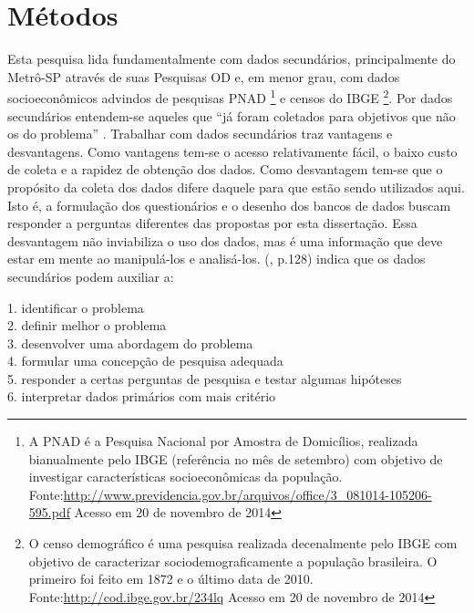 \chapter{Métodos}\label{chap:metodo}


Esta pesquisa lida fundamentalmente com dados secundários, principalmente do Metrô-SP através de suas Pesquisas OD e, em menor grau, com dados socioeconômicos advindos de pesquisas PNAD%
\footnote{A PNAD é a Pesquisa Nacional por Amostra de Domicílios, realizada bianualmente pelo IBGE (referência no mês de setembro) com objetivo de investigar características socioeconômicas da população. Fonte:\url{http://www.previdencia.gov.br/arquivos/office/3_081014-105206-595.pdf} Acesso em 20 de novembro de 2014} e censos do IBGE%
\footnote{O censo demográfico é uma pesquisa realizada decenalmente pelo IBGE com objetivo de caracterizar sociodemograficamente a população brasileira. O primeiro foi feito em 1872 e o último data de 2010. Fonte:\url{http://cod.ibge.gov.br/234lq} Acesso em 20 de novembro de 2014}.
Por dados secundários entendem-se aqueles que ``já foram coletados para objetivos que não os do problema'' \cite[p.127]{MALHORTA2001}. Trabalhar com dados secundários traz vantagens e desvantagens. Como vantagens tem-se o acesso relativamente fácil, o baixo custo de coleta e a rapidez de obtenção dos dados. Como desvantagem tem-se que o propósito da coleta dos dados difere daquele para que estão sendo utilizados aqui. Isto é, a formulação dos questionários e o desenho dos bancos de dados buscam responder a perguntas diferentes das propostas por esta dissertação.
Essa desvantagem não inviabiliza o uso dos dados, mas é uma informação que deve estar em mente ao manipulá-los e analisá-los.  (\citeyear{MALHORTA2001}, p.128) indica que os dados secundários podem auxiliar a:

\begin{citacao}
	1. identificar o problema\\
	2. definir melhor o problema\\
	3. desenvolver uma abordagem do problema\\
	4. formular uma concepção de pesquisa adequada\\
	5. responder a certas perguntas de pesquisa e testar algumas hipóteses\\
	6. interpretar dados primários com mais critério
\end{citacao}

